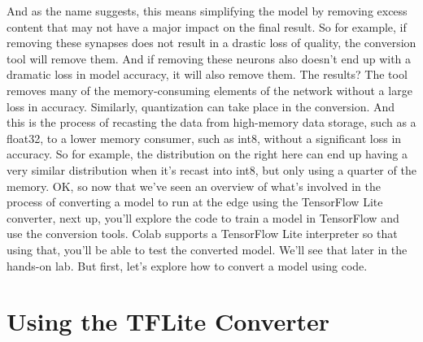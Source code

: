 And as the name suggests, this means simplifying the model
by removing excess content that may not have
a major impact on the final result. So for example, if removing these synapses
does not result in a drastic loss of quality,
the conversion tool will remove them.
And if removing these neurons also doesn't end up
with a dramatic loss in model accuracy, it will also remove them.
The results?
The tool removes many of the memory-consuming elements
of the network without a large loss in accuracy.
Similarly, quantization can take place in the conversion.
And this is the process of recasting the data from high-memory data
storage, such as a float32, to a lower memory consumer, such as int8,
without a significant loss in accuracy.
So for example, the distribution on the right
here can end up having a very similar distribution when it's recast
into int8, but only using a quarter of the memory.
OK, so now that we've seen an overview of what's
involved in the process of converting a model
to run at the edge using the TensorFlow Lite converter, next up,
you'll explore the code to train a model in TensorFlow
and use the conversion tools.
Colab supports a TensorFlow Lite interpreter
so that using that, you'll be able to test the converted model.
We'll see that later in the hands-on lab.
But first, let's explore how to convert a model using code.

\section{Using the TFLite Converter}

